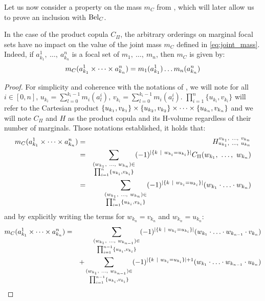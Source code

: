 Let us now consider a property on the mass $m_C$ from , which will later allow us to prove an inclusion with $\mathrm{Bel}_C$.
\begin{proposition}
    In the case of the product copula $C_\Pi$, the arbitrary orderings on marginal focal sets have no impact on the value of the joint mass $m_C$ defined in \eqref{eq:joint_mass}. Indeed, if $a^1_{k_1}, ~\ldots, ~a^n_{k_n}$ is a focal set of $m_1, ~\ldots, ~m_n$, then $m_C$ is given by:
    \begin{eqnarray}\label{eq:joint_mass_product}
        m_C(a^1_{k_1}\times\dots\times a^n_{k_n}) = m_1(a^1_{k_1})\ldots m_n(a^n_{k_n})
    \end{eqnarray}
\end{proposition}

\begin{proof}
    For simplicity and coherence with the notations of , we will note for all $i\in[0,n]$, $u_{k_i}=\sum_{l=0}^{k_i-1}m_i(a_l^i)$, $v_{k_i}=\sum_{l=0}^{k_i-1}m_i(a_l^i)$. $\prod_{i=1}^n\{u_{k_i}, v_{k_i}\}$ will refer to the Cartesian product $\{u_{k_1}, v_{k_1}\}\times\{u_{k_2}, v_{k_2}\}\times\dots\times\{u_{k_n}, v_{k_n}\}$ and we will note $C_\Pi$ and $H$ as the product copula and its H-volume regardless of their number of marginals. Those notations established, it holds that:
    \begin{eqnarray*}
        m_C(a^1_{k_1}\times\dots\times a^{n}_{k_{n}}) &=& H_{u_{k_1} , ~\ldots, ~ u_{k_n}}^{v_{k_1} , ~\ldots, ~ v_{k_n}}\\
        &=&\sum_{\substack{(w_{k_1} , ~\ldots, ~ w_{k_n})\in\\\prod_{i=1}^{n}\{u_{k_i}, v_{k_i}\}}}(-1)^{|\{k~|~w_{k_i}=u_{k_i}\}|}C_\Pi(w_{k_1} , ~\ldots, ~ w_{k_n})\\
        &=&\sum_{\substack{(w_{k_1} , ~\ldots, ~ w_{k_n})\in\\\prod_{i=1}^{n}\{u_{k_i}, v_{k_i}\}}}(-1)^{|\{k~|~w_{k_i}=u_{k_i}\}|}(w_{k_1} \cdot\ldots\cdot w_{k_n})
    \end{eqnarray*}
    and by explicitly writing the terms for $w_{k_n}=v_{k_n}$ and $w_{k_n}=u_{k_n}$:
    \begin{eqnarray*}
        m_C(a^1_{k_1}\tdt a^{n}_{k_{n}})&=&\sum_{\substack{(w_{k_1} \enum w_{k_{n-1}})\in\\\prod_{i=1}^{n-1}\{u_{k_i}, v_{k_i}\}}}(-1)^{|\{k~|~w_{k_i}=u_{k_i}\}|}(w_{k_1} \cdot\ldots\cdot w_{k_{n-1}}\cdot v_{k_n})\\
        && + \sum_{\substack{(w_{k_1} \enum w_{k_{n-1}})\in\\\prod_{i=1}^{n-1}\{u_{k_i}, v_{k_i}\}}}(-1)^{|\{k~|~w_{k_i}=u_{k_i}\}|+1}(w_{k_1} \cdot\ldots\cdot w_{k_{n-1}}\cdot u_{k_n})\\

\end{eqnarray*}
\end{proof}
